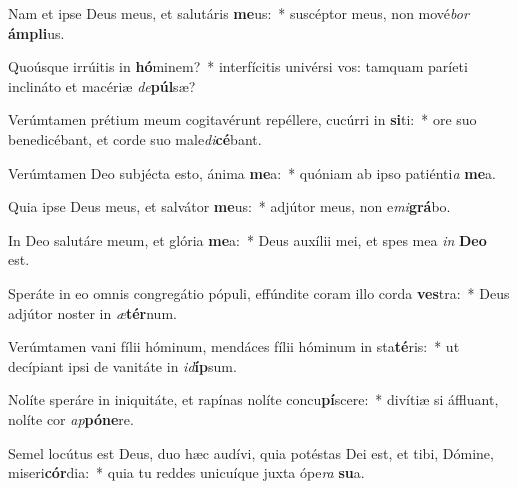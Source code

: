 \item Nam et ipse Deus meus, et salutáris \textbf{me}us:~* suscéptor meus, non mové\textit{bor} \textbf{ám}\textbf{pli}us.
\item Quoúsque irrúitis in \textbf{hó}minem?~* interfícitis univérsi vos: tamquam paríeti inclináto et macériæ \textit{de}\textbf{púl}sæ?
\item Verúmtamen prétium meum cogitavérunt repéllere, cucúrri in \textbf{si}ti:~* ore suo benedicébant, et corde suo male\textit{di}\textbf{cé}bant.
\item Verúmtamen Deo subjécta esto, ánima \textbf{me}a:~* quóniam ab ipso patiénti\textit{a} \textbf{me}a.
\item Quia ipse Deus meus, et salvátor \textbf{me}us:~* adjútor meus, non e\textit{mi}\textbf{grá}bo.
\item In Deo salutáre meum, et glória \textbf{me}a:~* Deus auxílii mei, et spes mea \textit{in} \textbf{De}\textbf{o} est.
\item Speráte in eo omnis congregátio pópuli, effúndite coram illo corda \textbf{ves}tra:~* Deus adjútor noster in \textit{æ}\textbf{tér}num.
\item Verúmtamen vani fílii hóminum, mendáces fílii hóminum in sta\textbf{té}ris:~* ut decípiant ipsi de vanitáte in \textit{id}\textbf{íp}sum.
\item Nolíte speráre in iniquitáte, et rapínas nolíte concu\textbf{pí}scere:~* divítiæ si áffluant, nolíte cor \textit{ap}\textbf{pó}\textbf{ne}re.
\item Semel locútus est Deus, duo hæc audívi, quia potéstas Dei est, et tibi, Dómine, miseri\textbf{cór}dia:~* quia tu reddes unicuíque juxta ópe\textit{ra} \textbf{su}a.
